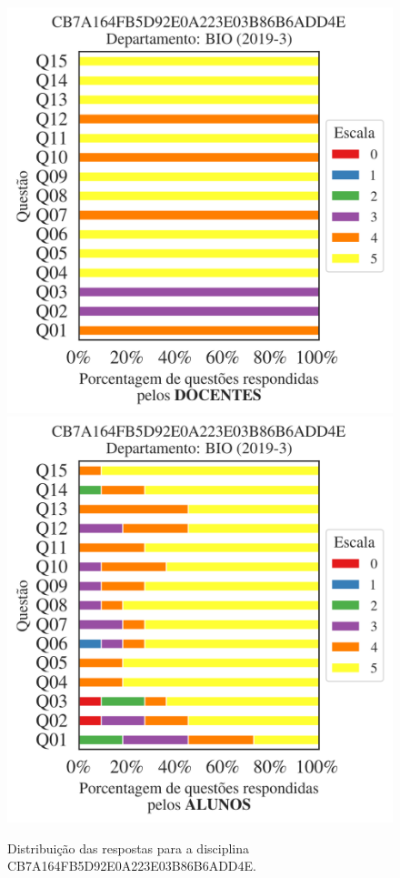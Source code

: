 \documentclass[a4paper,10pt]{article}
\begin{document}
\begin{figure}[h]
\centering
\includegraphics[width=0.485\linewidth]{analise_disciplina_departamento_BIO_CB7A164FB5D92E0A223E03B86B6ADD4E_docentes.png}
\includegraphics[width=0.485\linewidth]{analise_disciplina_departamento_BIO_CB7A164FB5D92E0A223E03B86B6ADD4E_alunos.png}
\caption{\label{fig:analise_geral_departamento}                Distribuição das respostas para a disciplina CB7A164FB5D92E0A223E03B86B6ADD4E. }
\end{figure}
\end{document}
